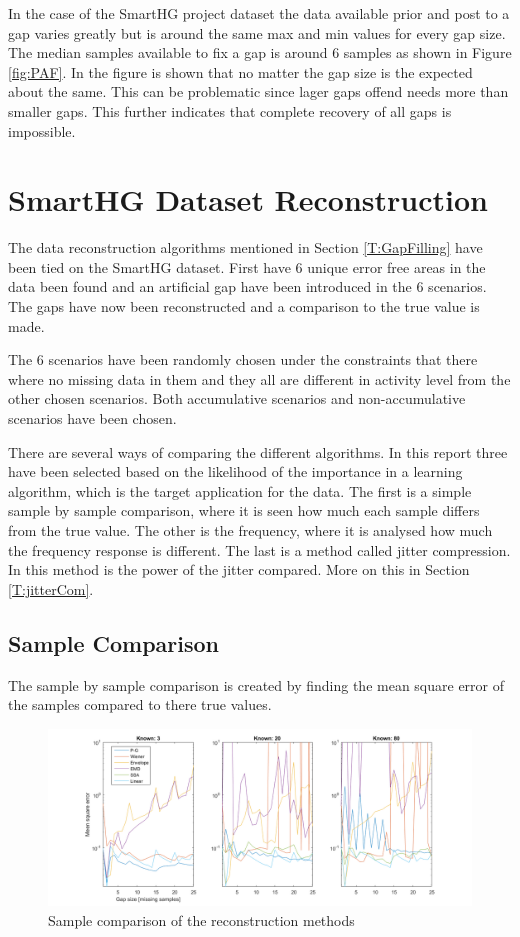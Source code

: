 In the case of the SmartHG project dataset the data available prior and post to a gap varies greatly but is around the same max and min values for every gap size. The median samples available to fix a gap is around 6 samples as shown in Figure \ref{fig:PAF}. In the figure is shown that no matter the gap size is the expected  about the same. This can be problematic since lager gaps offend needs more  than smaller gaps. This further indicates that complete recovery of all gaps is impossible. 

\section{SmartHG Dataset Reconstruction}
The data reconstruction algorithms mentioned in Section \ref{T:GapFilling} have been tied on the SmartHG dataset. First have 6 unique error free areas in the data been found and an artificial gap have been introduced in the 6 scenarios. 
The gaps have now been reconstructed and a comparison to the true value is made. 

The 6 scenarios have been randomly chosen under the constraints that there where no missing data in them and they all are different in activity level from the other chosen scenarios. Both accumulative scenarios and non-accumulative scenarios have been chosen. 

There are several ways of comparing the different algorithms. In this report three have been selected based on the likelihood of the importance in a learning algorithm, which is the target application for the data. The first is a simple sample by sample comparison, where it is seen how much each sample differs from the true value. The other is the frequency, where it is analysed how much the frequency response is different. The last is a method called jitter compression. In this method is the power of the jitter compared. More on this in Section \ref{T:jitterCom}.

\subsection{Sample Comparison}
The sample by sample comparison is created by finding the mean square error of the samples compared to there true values.  

\begin{figure}[H]
\centering
\includegraphics[width=1\textwidth]{billeder/RecNorm.png}
\caption{Sample comparison of the reconstruction methods}
\label{fig:RecNorm}
\end{figure}

